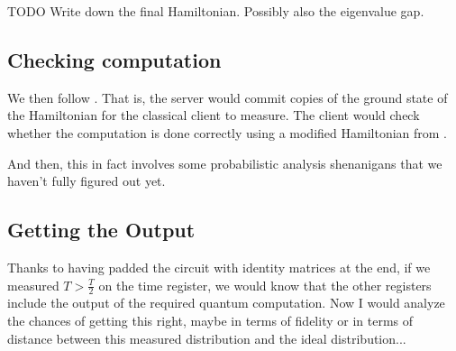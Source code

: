 TODO Write down the final Hamiltonian. Possibly also the eigenvalue gap.

\subsection{Checking computation}

We then follow \cite{mahadev_delegation}. That is, the server would commit copies of the ground state of the Hamiltonian for the classical client to measure. The client would check whether the computation is done correctly using a modified Hamiltonian from \cite{kempe_kitaev_regev_2006}. 

And then, this in fact involves some probabilistic analysis shenanigans that we haven't fully figured out yet.

\subsection{Getting the Output}

Thanks to having padded the circuit with identity matrices at the end, if we measured $T>\frac{T}{2}$ on the time register, we would know that the other registers include the output of the required quantum computation. Now I would analyze the chances of getting this right, maybe in terms of fidelity or in terms of distance between this measured distribution and the ideal distribution...


